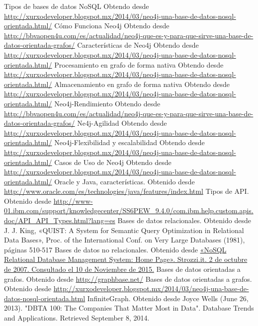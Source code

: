 \begin{thebibliography}{1}
    Tipos de bases de datos NoSQL Obtendo desde \url{http://xurxodeveloper.blogspot.mx/2014/03/neo4j-una-base-de-datos-nosql-orientada.html/}	
    Cómo Funciona Neo4j Obtendo desde \url{http://bbvaopen4u.com/es/actualidad/neo4j-que-es-y-para-que-sirve-una-base-de-datos-orientada-grafos/}
    Características de Neo4j Obtendo desde \url{http://xurxodeveloper.blogspot.mx/2014/03/neo4j-una-base-de-datos-nosql-orientada.html/}	
    Procesamiento en grafo de forma nativa Obtendo desde \url{http://xurxodeveloper.blogspot.mx/2014/03/neo4j-una-base-de-datos-nosql-orientada.html/}	
    Almacenamiento en grafo de forma nativa Obtendo desde \url{http://xurxodeveloper.blogspot.mx/2014/03/neo4j-una-base-de-datos-nosql-orientada.html/}	
    Neo4j-Rendimiento Obtendo desde \url{http://bbvaopen4u.com/es/actualidad/neo4j-que-es-y-para-que-sirve-una-base-de-datos-orientada-grafos/}	
   	 Ne4j-Agilidad Obtendo desde \url{http://xurxodeveloper.blogspot.mx/2014/03/neo4j-una-base-de-datos-nosql-orientada.html/}	
    Neo4j-Flexibilidad y escalabilidad Obtendo desde \url{http://xurxodeveloper.blogspot.mx/2014/03/neo4j-una-base-de-datos-nosql-orientada.html/}
    Casos de Uso de Neo4j Obtendo desde \url{http://xurxodeveloper.blogspot.mx/2014/03/neo4j-una-base-de-datos-nosql-orientada.html/}	
    Oracle y Java, características. Obtenido desde \url{http://www.oracle.com/es/technologies/java/features/index.html}
   Tipos de API. Obtenido desde \url{http://www-01.ibm.com/support/knowledgecenter/SS6PEW_9.4.0/com.ibm.help.custom.apis.doc/API_API_Types.html?lang=es}
   Bases de datos relacionales. Obtenido desde J. J. King, «QUIST: A System for Semantic Query Optimization in Relational Data Bases», Proc. of the International Conf. on Very Large Databases (1981),
páginas 510-517
   Bases de datos no relacionales. Obtenido desde \url{ «NoSQL Relational Database Management System: Home Page». Strozzi.it. 2 de octubre de 2007. Consultado el 10 de Noviembre de 2015.}
   Bases de datos orientadas a grafos. Obtenido desde \url{ http://graphbase.net/}
   Bases de datos orientadas a grafos. Obtenido desde \url{ http://xurxodeveloper.blogspot.mx/2014/03/neo4j-una-base-de-datos-nosql-orientada.html}
   InfiniteGraph. Obtenido desde  Joyce Wells (June 26, 2013). "DBTA 100: The Companies That Matter Most in Data". Database Trends and Applications. Retrieved September 8, 2014.

\end{thebibliography}
